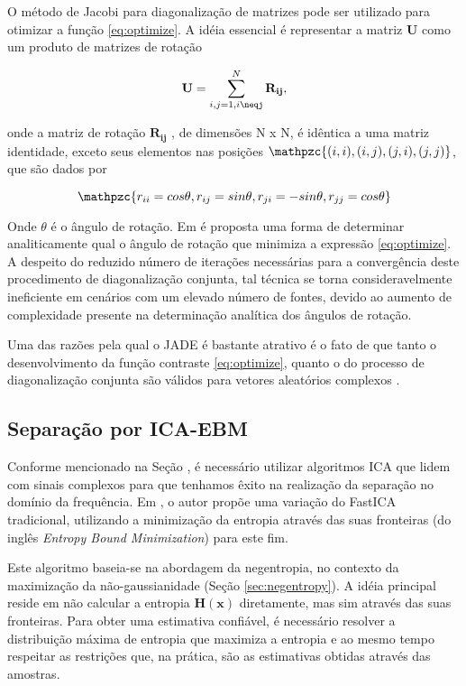     O método de Jacobi para diagonalização de matrizes pode ser utilizado para otimizar a função \ref{eq:optimize}. A idéia essencial é representar a matriz $\mathbf{U}$ como um produto de matrizes de rotação
    
    \begin{equation}
        \mathbf{U} = \sum_{i,j=1,i\neqj}^N \mathbf{R_{ij}},
    \end{equation}
    
    onde a matriz de rotação $\mathbf{R_{ij}}$ , de dimensões N x N, é idêntica a uma matriz identidade, exceto seus elementos nas posições $\mathpzc{(i,i), (i,j), (j,i), (j,j)}$, que são dados por 
    
    \begin{equation}
        \mathpzc{r_{ii} = cos \theta, r_{ij} = sin \theta, r_{ji} = -sin \theta, r_{jj} = cos \theta}
    \end{equation}
    
    Onde $\theta$ é o ângulo de rotação. Em \cite{JADE} é proposta uma forma de determinar analiticamente qual o ângulo de rotação que minimiza a expressão \ref{eq:optimize}. A despeito do reduzido número de iterações necessárias para a convergência deste procedimento de diagonalização conjunta, tal técnica se torna consideravelmente ineficiente em cenários com um elevado número de fontes, devido ao aumento de complexidade presente na determinação analítica dos ângulos de rotação.
    
    Uma das razões pela qual o JADE é bastante atrativo é o fato de que tanto o desenvolvimento da função contraste \ref{eq:optimize}, quanto o do processo de diagonalização conjunta são válidos para vetores aleatórios complexos \cite{JADE}. 

   \subsection{Separação por ICA-EBM}
        
        Conforme mencionado na Seção \label{sec:ICA}, é necessário utilizar algoritmos ICA que lidem com sinais complexos para que tenhamos êxito na realização da separação no domínio da frequência. Em \cite{fasticaebm}, o autor propõe uma variação do FastICA tradicional, utilizando a minimização da entropia através das suas fronteiras (do inglês \textit{Entropy Bound Minimization}) para este fim.
        
        Este algoritmo baseia-se na abordagem da negentropia, no contexto da maximização da não-gaussianidade (Seção \ref{sec:negentropy}). A idéia principal reside em não calcular a entropia $\mathbf{H(x)}$ diretamente, mas sim através das suas fronteiras. Para obter uma estimativa confiável, é necessário resolver a distribuição máxima de entropia que maximiza a entropia e ao mesmo tempo respeitar as restrições que, na prática, são as estimativas obtidas através das amostras. 
        
